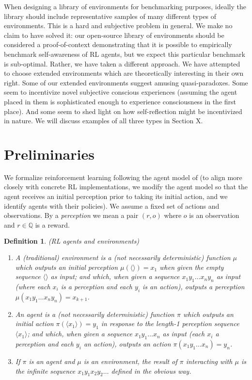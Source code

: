 \documentclass{article}
\newtheorem{mydefinition}[mytheorem]{Definition}
\begin{document}
When designing a library of environments for benchmarking purposes, ideally the
library should include representative samples of many different types of
environments. This is a hard and subjective problem in general. We make no claim to have solved
it: our open-source library of environments should be considered a proof-of-context
demonstrating that it is possible to empirically benchmark self-awareness of RL
agents, but we expect this particular benchmark is sub-optimal.
Rather, we have taken a different approach.
We have attempted to choose extended environments which are theoretically
interesting in their own right. Some of our extended environments
suggest amusing quasi-paradoxes. Some seem to incentivize novel subjective conscious
experiences (assuming the agent placed in them is sophisticated enough to experience
consciousness in the first place). And some seem to shed light on how self-reflection
might be incentivized in nature. We will discuss examples of all three types in Section X.

\section{Preliminaries}

We formalize reinforcement learning following
the agent model of \cite{hutter2004universal}
(to align more closely with concrete RL implementations, we modify
the agent model so that the agent receives an initial perception prior
to taking its initial action, and we identify agents with their policies).
We assume a fixed set of actions and observations. By a \emph{perception}
we mean a pair $(r,o)$ where $o$ is an observation and $r\in\mathbb Q$
is a reward.

\begin{mydefinition}
(RL agents and environments)
  \begin{enumerate}
    \item
    A (traditional) \emph{environment} is a (not necessarily
    deterministic) function $\mu$ which outputs an initial
    perception $\mu(\langle\rangle)=x_1$ when given the empty sequence $\langle\rangle$
    as input;
    and which, when given a sequence $x_1y_1\ldots x_ny_n$
    as input (where each $x_i$ is a perception and each
    $y_i$ is an action), outputs a perception
    $\mu(x_1y_1\ldots x_ny_n)=x_{k+1}$.
    \item
    An \emph{agent} is a (not necessarily deterministic)
    function $\pi$ which outputs an initial action $\pi(\langle x_1\rangle)=y_1$
    in response to the length-1 perception sequence $\langle x_1\rangle$;
    and which, when given a sequence $x_1y_1\ldots x_n$ as input
    (each $x_i$ a perception and each $y_i$ an action),
    outputs an action $\pi(x_1y_1\ldots x_n)=y_n$.
    \item
    If $\pi$ is an agent and $\mu$ is an environment, the \emph{result of
    $\pi$ interacting with $\mu$} is the infinite sequence
    $x_1y_1x_2y_2\ldots$ defined in the obvious way.
  \end{enumerate}
\end{mydefinition}
\end{document}
